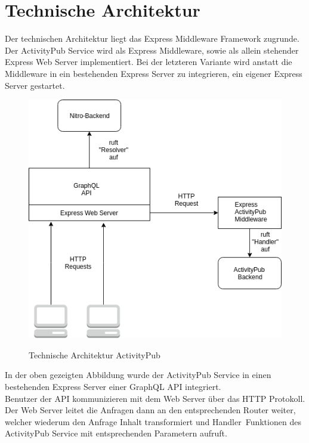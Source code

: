\section{Technische Architektur}
	Der technischen Architektur liegt das Express Middleware Framework zugrunde. Der ActivityPub Service wird als Express Middleware, sowie als allein stehender Express Web Server implementiert. Bei der letzteren Variante wird anstatt die Middleware in ein bestehenden Express Server zu integrieren, ein eigener Express Server gestartet.\\
	\begin{figure}[h]
		\centering
		\includegraphics[scale=0.6]{figures/technische-architektur-activitypub.png}
		\label{technische-architektur-activitypub}
		\caption{Technische Architektur ActivityPub}
	\end{figure}
	In der oben gezeigten Abbildung wurde der ActivityPub Service in einen bestehenden Express Server einer GraphQL API integriert.\\
	
	Benutzer der API kommunizieren mit dem Web Server über das HTTP Protokoll. Der Web Server leitet die Anfragen dann an den entsprechenden Router weiter, welcher wiederum den Anfrage Inhalt transformiert und \glqq Handler\grqq~Funktionen des ActivityPub Service mit entsprechenden Parametern aufruft.\\
	
